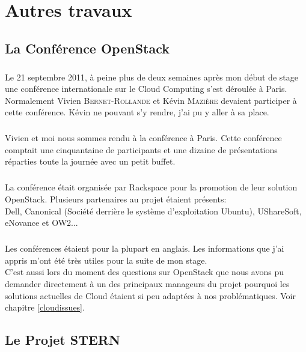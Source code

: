 \chapter{Autres travaux}

\section{La Conférence OpenStack}
\paragraph*{}
Le 21 septembre 2011, à peine plus de deux semaines après mon début de stage une conférence internationale sur le Cloud Computing s'est déroulée à Paris.
Normalement Vivien \textsc{Bernet-Rollande} et Kévin \textsc{Mazière} devaient participer à cette conférence.
Kévin ne pouvant s'y rendre, j'ai pu y aller à sa place.

\paragraph*{}
Vivien et moi nous sommes rendu à la conférence à Paris.
Cette conférence comptait une cinquantaine de participants et une dizaine de présentations réparties toute la journée avec un petit buffet.

\paragraph*{}
La conférence était organisée par Rackspace pour la promotion de leur solution OpenStack. Plusieurs partenaires au projet étaient présents:\\
Dell, Canonical (Société derrière le système d'exploitation Ubuntu), UShareSoft, eNovance et OW2...

\paragraph*{}
Les conférences étaient pour la plupart en anglais. Les informations que j'ai appris m'ont été très utiles pour la suite de mon stage.\\
C'est aussi lors du moment des questions sur OpenStack que nous avons pu demander directement à un des principaux manageurs du projet pourquoi les solutions actuelles de Cloud
étaient si peu adaptées à nos problématiques. Voir chapitre \ref{cloudissues}.


\section{Le Projet STERN}
